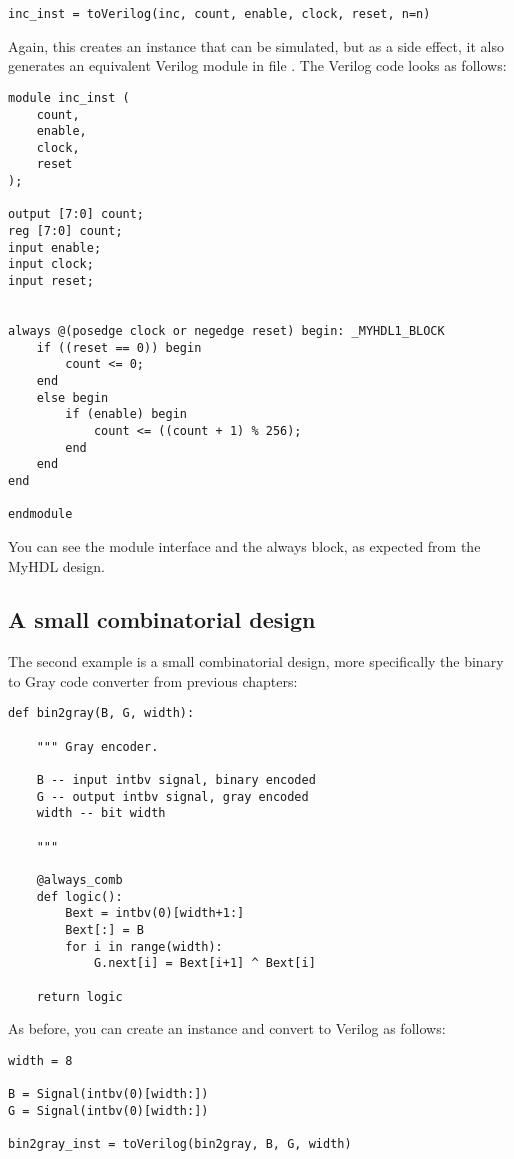 \begin{verbatim}
inc_inst = toVerilog(inc, count, enable, clock, reset, n=n)
\end{verbatim}

Again, this creates an instance that can be simulated, but as a side
effect, it also generates an equivalent Verilog module in file .
The Verilog code looks as follows:

\begin{verbatim}
module inc_inst (
    count,
    enable,
    clock,
    reset
);

output [7:0] count;
reg [7:0] count;
input enable;
input clock;
input reset;


always @(posedge clock or negedge reset) begin: _MYHDL1_BLOCK
    if ((reset == 0)) begin
        count <= 0;
    end
    else begin
        if (enable) begin
            count <= ((count + 1) % 256);
        end
    end
end

endmodule
\end{verbatim}

You can see the module interface and the always block, as expected
from the MyHDL design. 

\subsection{A small combinatorial design\label{conv-usage-comb}}

The second example is a small combinatorial design, more
specifically the binary to Gray code converter from previous chapters:

\begin{verbatim}
def bin2gray(B, G, width):
    
    """ Gray encoder.

    B -- input intbv signal, binary encoded
    G -- output intbv signal, gray encoded
    width -- bit width
    
    """

    @always_comb
    def logic():
        Bext = intbv(0)[width+1:]
        Bext[:] = B
        for i in range(width):
            G.next[i] = Bext[i+1] ^ Bext[i]

    return logic
\end{verbatim}

As before, you can create an instance and convert to
Verilog as follows:

\begin{verbatim}
width = 8

B = Signal(intbv(0)[width:])
G = Signal(intbv(0)[width:])

bin2gray_inst = toVerilog(bin2gray, B, G, width)
 \end{verbatim}

